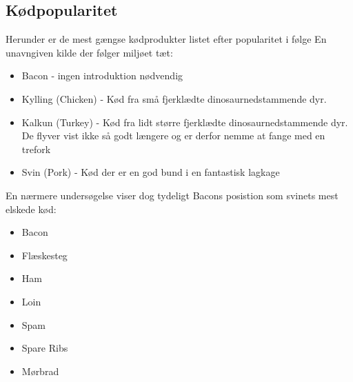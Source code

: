 \subsection{Kødpopularitet}

Herunder er de mest gængse kødprodukter listet efter popularitet i følge En unavngiven kilde der følger miljøet tæt:\\
\begin{itemize}
\item Bacon \cite{bib:url:WikiBacon} - ingen introduktion nødvendig
\item Kylling (Chicken) \cite{bib:url:WikiChicken} - Kød fra små fjerklædte dinosaurnedstammende dyr.
\item Kalkun (Turkey) \cite{bib:url:WikiTurkey}- Kød fra lidt større fjerklædte dinosaurnedstammende dyr. De flyver vist ikke så godt længere og er derfor nemme at fange med en trefork
\item Svin (Pork) \cite{bib:url:WikiPork} - Kød der er en god bund i en fantastisk lagkage
\end{itemize}


En nærmere undersøgelse viser dog tydeligt Bacons posistion som svinets mest elskede kød:
\begin{itemize}
\item Bacon \cite{bib:url:WikiBacon}
\item Flæskesteg \cite{bib:url:WikiRoastPork}
\item Ham \cite{bib:url:WikiHam}
\item Loin \cite{bib:url:WikiLoin}
\item Spam \cite{bib:url:WikiSpam}
\item Spare Ribs \cite{bib:url:WikiSpareRibs}
\item Mørbrad \cite{bib:url:WikiTenderLoin}
\end{itemize}

